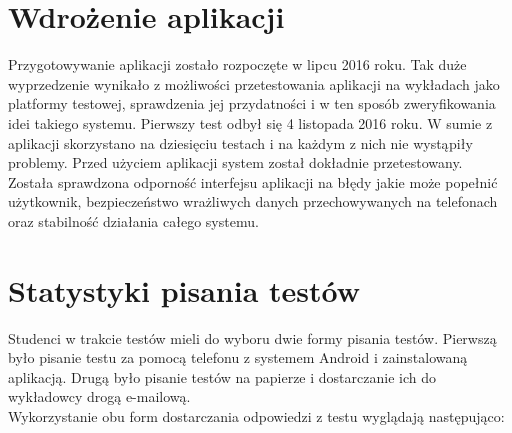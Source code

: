 \documentclass[eng]{mgr}
\begin{document}
		\section{Wdrożenie aplikacji}
		
		Przygotowywanie aplikacji zostało rozpoczęte w lipcu 2016 roku. Tak duże wyprzedzenie wynikało z możliwości przetestowania aplikacji na wykładach jako platformy testowej, sprawdzenia jej przydatności i w ten sposób zweryfikowania idei takiego systemu. Pierwszy test odbył się 4 listopada 2016 roku. W sumie z aplikacji skorzystano na dziesięciu testach i na każdym z nich nie wystąpiły problemy. Przed użyciem aplikacji system został dokładnie przetestowany. Została sprawdzona odporność interfejsu aplikacji na błędy jakie może popełnić użytkownik, bezpieczeństwo wrażliwych danych przechowywanych na telefonach oraz stabilność działania całego systemu.

		\section{Statystyki pisania testów}
			
		Studenci w trakcie testów mieli do wyboru dwie formy pisania testów. Pierwszą było pisanie testu za pomocą telefonu z systemem Android i zainstalowaną aplikacją. Drugą było pisanie testów na papierze i dostarczanie ich do wykładowcy drogą e-mailową.\\
		
		Wykorzystanie obu form dostarczania odpowiedzi z testu wyglądają następująco:
			
		\begin{center}
		\end{center}
	
\end{document}
